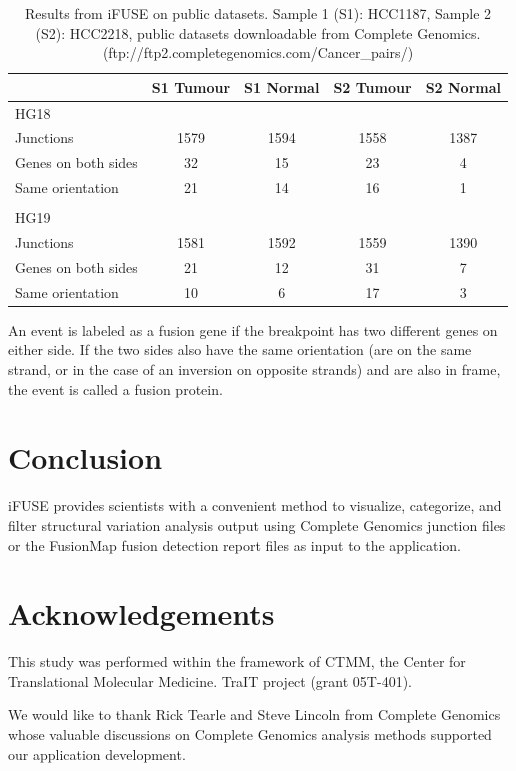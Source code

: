 \begin{table}[!t]
    \begin{tabular}{lcccc}
        \toprule
                              & S1 Tumour  & S1 Normal  & S2 Tumour   & S2 Normal \\
        \midrule
        HG18                  &            &            &             &         \\
        Junctions             & 1579       & 1594       & 1558        & 1387    \\
        Genes on both sides   & 32         & 15         & 23          & 4       \\
        Same orientation      & 21         & 14         & 16          & 1       \\
                              &            &            &             &         \\
        HG19                  &            &            &             &         \\
        Junctions             & 1581       & 1592       & 1559        & 1390    \\
        Genes on both sides   & 21         & 12         & 31          & 7       \\
        Same orientation      & 10         & 6          & 17          & 3       \\
        \toprule
    \end{tabular}
    \caption{Results from iFUSE on public datasets. Sample 1 (S1): HCC1187, Sample 2 (S2): HCC2218, public datasets downloadable from Complete Genomics. (ftp://ftp2.completegenomics.com/Cancer\_pairs/)
    }
    \label{tab:results}
\end{table}

An event is labeled as a fusion gene if the breakpoint has two different genes on either side. If the two sides also have the same orientation (are on the same strand, or in the case of an inversion on opposite strands) and are also in frame, the event is called a fusion protein.

\section*{Conclusion}

iFUSE provides scientists with a convenient method to visualize, categorize, and filter structural variation analysis output using Complete Genomics junction files or the FusionMap fusion detection report files as input to the application.

\section*{Acknowledgements}

This study was performed within the framework of CTMM, the Center for Translational Molecular Medicine. TraIT project (grant 05T-401).

We would like to thank Rick Tearle and Steve Lincoln from Complete Genomics whose valuable discussions on Complete Genomics analysis methods supported our application development.




